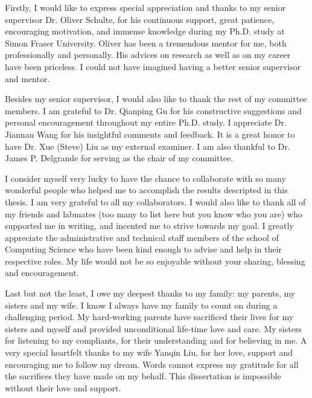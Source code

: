 \documentclass{sfuthesis}
\begin{document}
\begin{acknowledgements} 
Firstly, I would like to express  special appreciation and thanks to my senior supervisor Dr. Oliver Schulte, for his continuous support, great patience,  encouraging motivation, and immense knowledge during my Ph.D. study at Simon Fraser University. Oliver has been a tremendous mentor for me, both professionally and personally. His advices on research as well as on my career have been priceless. I could not have imagined having a better senior supervisor and mentor.

Besides my senior supervisor, I would also like to thank  the rest of my committee members. I am grateful to Dr. Qianping Gu for his  constructive suggestions and personal encouragement throughout my entire Ph.D. study.  I appreciate Dr. Jiannan  Wang for his insightful comments and feedback.  It is a great honor to have Dr. Xue (Steve) Liu as my external examiner. I am also thankful to Dr. James P. Delgrande  for serving as the chair of my committee.

I consider myself very lucky to have the chance to collaborate with so many wonderful people who helped me to accomplish the results descripted in this thesis. 
I am very grateful to all my collaborators. I would also like to thank all of my friends and labmates (too many to list here but you know who you are) who supported me in writing, and incented me to strive towards my goal. I  greatly appreciate the administrative and technical staff members of the school of Computing Science who have been kind enough to advise and help in their respective roles. My life would not be so enjoyable without your sharing, blessing and encouragement.


Last but not the least, I owe my deepest thanks to my family: my parents, my sisters and my wife. I know I always have my family to count on during a challenging period. My hard-working parents have sacrificed their lives for my sisters and myself and provided unconditional life-time love and care. My sisters for listening to my compliants, for their understanding and for believing in me.  A very special heartfelt thanks to my wife Yanqin Liu, for her love, support and encouraging me to follow my dream. Words cannot express my gratitude for all the sacrifices they have made on my behalf. This dissertation is impossible without their love and support.


\end{acknowledgements}

\tableofcontents\clearpage
{}\listoftables\clearpage
{}\listoffigures
\end{document}
